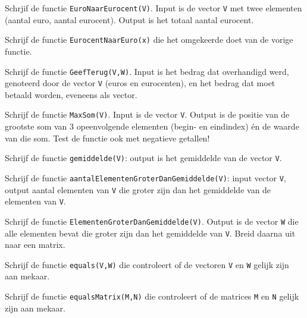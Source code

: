 \begin{oef}
Schrjif de functie \verb/EuroNaarEurocent(V)/. Input is de vector \verb/V/ met twee elementen (aantal euro, aantal eurocent). Output is het totaal aantal eurocent.
\end{oef}
\begin{oef}
Schrijf de functie \verb/EurocentNaarEuro(x)/ die het omgekeerde doet van de vorige functie.
\item Schrijf de functie \verb/GeefTerug(V,W)/. Input is het bedrag dat overhandigd werd, genoteerd door de vector \verb/V/ (euros en eurocenten), en het bedrag dat moet betaald worden, eveneens als vector.
\end{oef}
\begin{oef}
Schrijf de functie \verb/MaxSom(V)/. Input is de vector \verb/V/. Output is de positie van de grootste som van 3 opeenvolgende elementen (begin- en eindindex) én de waarde van die som. Test de functie ook met negatieve getallen!
\end{oef}
\begin{oef}
Schrijf de functie \verb/gemiddelde(V)/: output is het gemiddelde van de vector \verb/V/.
\end{oef}
\begin{oef}
Schrijf de functie \verb/aantalElementenGroterDanGemiddelde(V)/: input vector \verb/V/, output aantal elementen van \verb/V/ die groter zijn dan het gemiddelde van de elementen van \verb/V/.
\end{oef}
\begin{oef}
Schrijf de functie \verb/ElementenGroterDanGemiddelde(V)/. Output is de vector \verb/W/ die alle elementen bevat die groter zijn dan het gemiddelde van \verb/V/. Breid daarna uit naar een matrix.
\end{oef}
\begin{oef}
Schrijf de functie \verb/equals(V,W)/ die controleert of de vectoren \verb/V/ en \verb/W/ gelijk zijn aan mekaar.
\end{oef}
\begin{oef}
Schrijf de functie \verb/equalsMatrix(M,N)/ die controleert of de matrices \verb/M/ en \verb/N/ gelijk zijn aan mekaar.
\end{oef}








